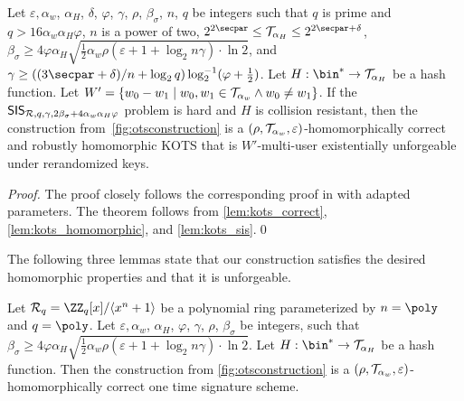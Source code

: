 \begin{theorem}\label{theo:kots}
Let $\varepsilon, \alpha_w$, $\alpha_H$, $\delta$, $\varphi$, $\gamma$, $\rho$, $\beta_\sigma$, $n$, $q$ be integers such that $q$ is prime and $q > 16\alpha_w\alpha_H\varphi$, $n$ is a power of two, $2^{2\secpar}\leq \tern_{\alpha_H} \leq 2^{2\secpar+\delta}$, $\beta_\sigma \geq 4\varphi\alpha_H\sqrt{\tfrac{1}{2}\alpha_w\rho(\varepsilon+1+\log_2n\gamma)\cdot\ln2}$, and $\gamma\geq((3\secpar+\delta)/n+\log_2q)\log^{-1}_2(\varphi+\tfrac{1}{2})$.
Let $H : \bin^* \to \tern_{\alpha_H}$ be a hash function.
Let $W' = \{w_0-w_1\mid w_0,w_1\in\mathcal{T}_{\alpha_w} \land w_0\neq w_1\}$.
If the $\mathsf{SIS}_{\mathcal{R},q,\gamma,2\beta_\sigma+4\alpha_w\alpha_H\varphi}$ problem is hard and $H$ is collision resistant, then the construction from~\autoref{fig:otsconstruction} is a $(\rho,\mathcal{T}_{\alpha_w},\varepsilon)$-homomorphically correct and robustly homomorphic KOTS that is $W'$-multi-user existentially unforgeable under rerandomized keys.
\end{theorem}
\begin{proof}
The proof closely follows the corresponding proof in \cite{CCS:FleSimZha22} with adapted parameters.
The theorem follows from \autoref{lem:kots_correct}, \autoref{lem:kots_homomorphic}, and \autoref{lem:kots_sis}.\qed
\end{proof}

The following three lemmas state that our construction satisfies the desired homomorphic properties and that it is unforgeable.

\begin{lemma}\label{lem:kots_correct}
  Let $\ring_q=\ZZ_q[x]/\langle x^n+1\rangle$ be a polynomial ring parameterized by $n=\poly$ and $q=\poly$.
Let $\varepsilon, \alpha_w$, $\alpha_H$, $\varphi$, $\gamma$, $\rho$, $\beta_\sigma$ be integers, such that $\beta_\sigma \geq 4\varphi\alpha_H\sqrt{\tfrac{1}{2}\alpha_w\rho(\varepsilon+1+\log_2n\gamma)\cdot\ln2}$.
Let $H : \bin^* \to \tern_{\alpha_H}$ be a hash function.
  Then the construction from \autoref{fig:otsconstruction} is a $(\rho,\mathcal{T}_{\alpha_w},\varepsilon)$-homomorphically correct one time signature scheme.
\end{lemma}

